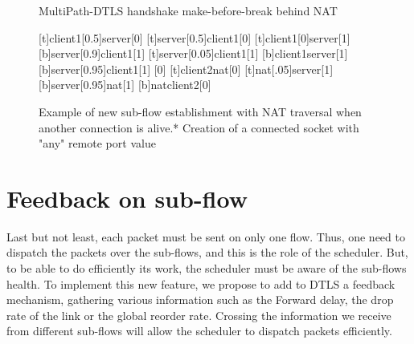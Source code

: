 \begin{figure}[!h]
\centering
\begin{msc}[r]{MultiPath-DTLS handshake make-before-break behind NAT}

\setlength{\instfootheight}{0em}
\setlength{\instheadheight}{0em}
\setlength{\instdist}{0.25\linewidth}
\setlength{\levelheight}{3em}


[t]{client1}[0.5]{server}[0]
\nextlevel
{}[t]{server}[0.5]{client1}[0]
\nextlevel
{}[t]{client1}[0]{server}[1]
\nextlevel
{}[b]{server}[0.9]{client1}[1]
\nextlevel[2]
[t]{server}[0.05]{client1}[1]
\nextlevel
{}
[b]{client1}{server}[1]
\nextlevel
{}[b]{server}[0.95]{client1}[1]
\nextlevel
{}
[0]
\nextlevel
{}[t]{client2}{nat}[0]
[t]{nat}[.05]{server}[1]
\nextlevel
{}[b]{server}[0.95]{nat}[1]
\nextlevel
{}[b]{nat}{client2}[0]
\nextlevel[2]
\end{msc}
\caption{Example of new sub-flow establishment with NAT traversal when another connection is alive.\newline{}* Creation of a connected socket with "any" remote port value }
\label{fig:HandshakeNAT}
\end{figure}

\newpage
\section{Feedback on sub-flow}

Last but not least, each packet must be sent on only one flow. Thus, one need to dispatch the packets over the sub-flows, and this is the role of the scheduler. But, to be able to do efficiently its work, the scheduler must be aware of the sub-flows health. To implement this new feature, we propose to add to DTLS a feedback mechanism, gathering various information such as the Forward delay, the drop rate of the link or the global reorder rate. Crossing the information we receive from different sub-flows will allow the scheduler to dispatch packets efficiently.

